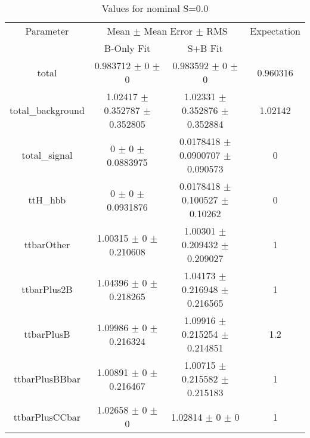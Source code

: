 \begin{table}
\centering
\caption{Values for nominal S=0.0}
\begin{tabular}{cccc}
\toprule
Parameter & \multicolumn{2}{c}{Mean $\pm$ Mean Error $\pm$ RMS} & Expectation\\
 & B-Only Fit & S+B Fit & \\
\midrule
total & \num{0.983712} $\pm$ \num{0} $\pm$ \num{0} & \num{0.983592} $\pm$ \num{0} $\pm$ \num{0} & \num{0.960316}\\
total\_background & \num{1.02417} $\pm$ \num{0.352787} $\pm$ \num{0.352805} & \num{1.02331} $\pm$ \num{0.352876} $\pm$ \num{0.352884} & \num{1.02142}\\
total\_signal & \num{0} $\pm$ \num{0} $\pm$ \num{0.0883975} & \num{0.0178418} $\pm$ \num{0.0900707} $\pm$ \num{0.090573} & \num{0}\\
ttH\_hbb & \num{0} $\pm$ \num{0} $\pm$ \num{0.0931876} & \num{0.0178418} $\pm$ \num{0.100527} $\pm$ \num{0.10262} & \num{0}\\
ttbarOther & \num{1.00315} $\pm$ \num{0} $\pm$ \num{0.210608} & \num{1.00301} $\pm$ \num{0.209432} $\pm$ \num{0.209027} & \num{1}\\
ttbarPlus2B & \num{1.04396} $\pm$ \num{0} $\pm$ \num{0.218265} & \num{1.04173} $\pm$ \num{0.216948} $\pm$ \num{0.216565} & \num{1}\\
ttbarPlusB & \num{1.09986} $\pm$ \num{0} $\pm$ \num{0.216324} & \num{1.09916} $\pm$ \num{0.215254} $\pm$ \num{0.214851} & \num{1.2}\\
ttbarPlusBBbar & \num{1.00891} $\pm$ \num{0} $\pm$ \num{0.216467} & \num{1.00715} $\pm$ \num{0.215582} $\pm$ \num{0.215183} & \num{1}\\
ttbarPlusCCbar & \num{1.02658} $\pm$ \num{0} $\pm$ \num{0} & \num{1.02814} $\pm$ \num{0} $\pm$ \num{0} & \num{1}\\
\bottomrule
\end{tabular}
\end{table}